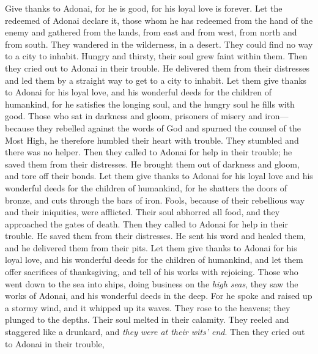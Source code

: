 \begin{biblechapter} %
 Give thanks to Adonai, for he is good, 
for his loyal love is forever.
\verse Let the redeemed of Adonai declare it, 
those whom he has redeemed from the hand of the enemy
\verse and gathered from the lands, 
from east and from west, from north and from south.
\verse They wandered in the wilderness, in a desert. 
They could find no way to a city to inhabit.
\verse Hungry and thirsty, 
their soul grew faint within them.
\verse Then they cried out to Adonai in their trouble. 
He delivered them from their distresses
\verse and led them by a straight way 
to get to a city to inhabit.
\verse Let them give thanks to Adonai for his loyal love, 
and his wonderful deeds for the children of humankind,
\verse for he satisfies the longing soul, 
and the hungry soul he fills with good.
\verse Those who sat in darkness and gloom, 
prisoners of misery and iron—
\verse because they rebelled against the words of God 
and spurned the counsel of the Most High,
\verse he therefore humbled their heart with trouble. 
They stumbled and there was no helper.
\verse Then they called to Adonai for help in their trouble; 
he saved them from their distresses.
\verse He brought them out of darkness and gloom, 
and tore off their bonds.
\verse Let them give thanks to Adonai for his loyal love 
and his wonderful deeds for the children of humankind,
\verse for he shatters the doors of bronze, 
and cuts through the bars of iron.
\verse Fools, because of their rebellious way 
and their iniquities, were afflicted.
\verse Their soul abhorred all food, 
and they approached the gates of death.
\verse Then they called to Adonai for help in their trouble. 
He saved them from their distresses.
\verse He sent his word and healed them, 
and he delivered them from their pits.
\verse Let them give thanks to Adonai for his loyal love, 
and his wonderful deeds for the children of humankind,
\verse and let them offer sacrifices of thanksgiving, 
and tell of his works with rejoicing.
\verse Those who went down to the sea into ships, 
doing business on the \textit{high seas},
\verse they saw the works of Adonai, 
and his wonderful deeds in the deep.
\verse For he spoke and raised up a stormy wind, 
and it whipped up its waves.
\verse They rose to the heavens; they plunged to the depths. 
Their soul melted in their calamity.
\verse They reeled and staggered like a drunkard, 
and \textit{they were at their wits’ end}.
\verse Then they cried out to Adonai in their trouble, 

\end{biblechapter}
